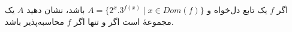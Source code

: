 اگر $f$ یک تابع دل‌خواه و $A = \{ 2^x . 3^{f(x)} \mid x \in Dom(f) \}$ باشد، نشان دهید $A$ یک مجموعهٔ  است اگر و تنها اگر $f$ محاسبه‌پذیر باشد.